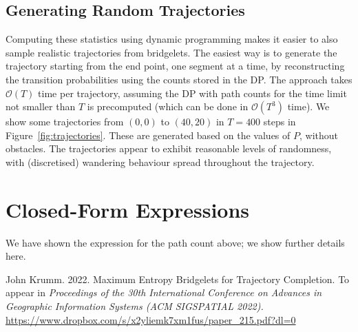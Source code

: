 \documentclass[11pt,a4paper,twoside,british]{article}
\begin{document}
\subsection{Generating Random Trajectories}\label{subsec:sampling}
Computing these statistics using dynamic programming makes it easier to also
sample realistic trajectories from bridgelets.
The easiest way is to generate the trajectory starting from the end point, one
segment at a time, by reconstructing the transition probabilities using the
counts stored in the DP.
The approach takes $\mathcal{O}(T)$ time per trajectory, assuming the DP with
path counts for the time limit not smaller than $T$ is precomputed (which can be
done in $\mathcal{O}(T^3)$ time).
We show some trajectories from $(0, 0)$ to $(40, 20)$ in $T = 400$ steps in
Figure~\ref{fig:trajectories}.
These are generated based on the values of $P$, without obstacles.
The trajectories appear to exhibit reasonable levels of randomness, with
(discretised) wandering behaviour spread throughout the trajectory.

\section{Closed-Form Expressions}
We have shown the expression for the path count above; we show further details
here.

\begin{thebibliography}{9}
John Krumm.
2022.
Maximum Entropy Bridgelets for Trajectory Completion.
To appear in \textit{Proceedings of the 30th International Conference on
Advances in Geographic Information Systems (ACM SIGSPATIAL 2022).}
\url{https://www.dropbox.com/s/x2yliemk7xm1fus/paper_215.pdf?dl=0}
\end{thebibliography}
\end{document}
